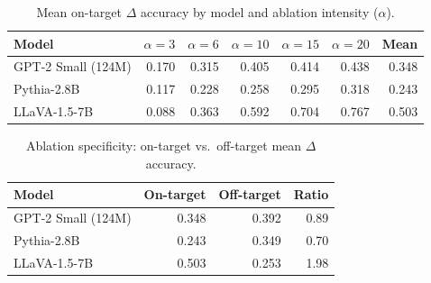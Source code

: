 \begin{table}[htbp]
\centering
\caption{Mean on-target $\Delta$ accuracy by model and ablation intensity ($\alpha$).}
\label{tab:model_alpha}
\begin{tabular}{lrrrrrr}
\toprule
Model & $\alpha=3$ & $\alpha=6$ & $\alpha=10$ & $\alpha=15$ & $\alpha=20$ & Mean \\
\midrule
GPT-2 Small (124M) & 0.170 & 0.315 & 0.405 & 0.414 & 0.438 & 0.348 \\
Pythia-2.8B & 0.117 & 0.228 & 0.258 & 0.295 & 0.318 & 0.243 \\
LLaVA-1.5-7B & 0.088 & 0.363 & 0.592 & 0.704 & 0.767 & 0.503 \\
\bottomrule
\end{tabular}
\end{table}

\begin{table}[htbp]
\centering
\caption{Ablation specificity: on-target vs.~off-target mean $\Delta$ accuracy.}
\label{tab:specificity}
\begin{tabular}{lrrr}
\toprule
Model & On-target & Off-target & Ratio \\
\midrule
GPT-2 Small (124M) & 0.348 & 0.392 & 0.89 \\
Pythia-2.8B & 0.243 & 0.349 & 0.70 \\
LLaVA-1.5-7B & 0.503 & 0.253 & 1.98 \\
\bottomrule
\end{tabular}
\end{table}